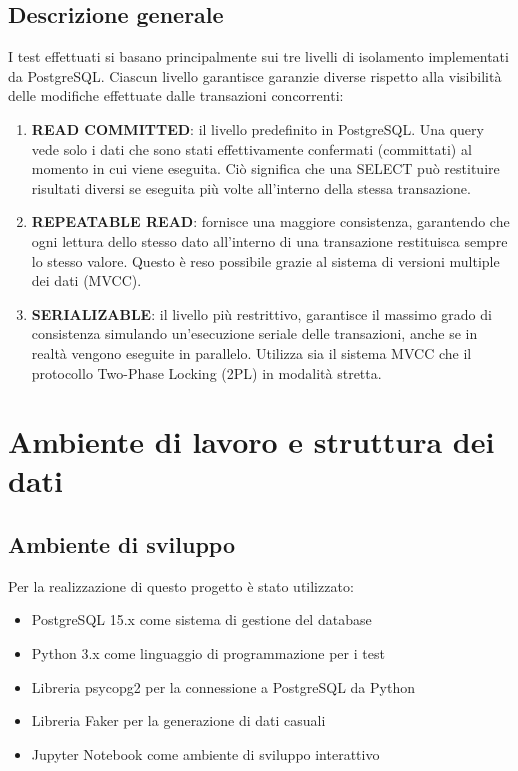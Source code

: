 \documentclass[a4paper,12pt]{report}
\begin{document}
\section{Descrizione generale}
I test effettuati si basano principalmente sui tre livelli di isolamento implementati da PostgreSQL. Ciascun livello garantisce garanzie diverse rispetto alla visibilità delle modifiche effettuate dalle transazioni concorrenti:

\begin{enumerate}
\item \textbf{READ COMMITTED}: il livello predefinito in PostgreSQL. Una query vede solo i dati che sono stati effettivamente confermati (committati) al momento in cui viene eseguita. Ciò significa che una SELECT può restituire risultati diversi se eseguita più volte all'interno della stessa transazione.

\item \textbf{REPEATABLE READ}: fornisce una maggiore consistenza, garantendo che ogni lettura dello stesso dato all'interno di una transazione restituisca sempre lo stesso valore. Questo è reso possibile grazie al sistema di versioni multiple dei dati (MVCC).

\item \textbf{SERIALIZABLE}: il livello più restrittivo, garantisce il massimo grado di consistenza simulando un'esecuzione seriale delle transazioni, anche se in realtà vengono eseguite in parallelo. Utilizza sia il sistema MVCC che il protocollo Two-Phase Locking (2PL) in modalità stretta.
\end{enumerate}

\chapter{Ambiente di lavoro e struttura dei dati}
\section{Ambiente di sviluppo}
Per la realizzazione di questo progetto è stato utilizzato:
\begin{itemize}
    \item PostgreSQL 15.x come sistema di gestione del database
    \item Python 3.x come linguaggio di programmazione per i test
    \item Libreria psycopg2 per la connessione a PostgreSQL da Python
    \item Libreria Faker per la generazione di dati casuali
    \item Jupyter Notebook come ambiente di sviluppo interattivo
\end{itemize}
\end{document}

